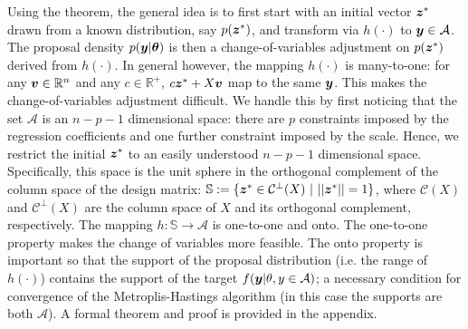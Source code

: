 \documentclass[ba]{imsart}
\def\bth{\mbox{\boldmath $\theta$}}
\newcommand{\by}{\mbox{\boldmath $y$}}
\newcommand{\bz}{\mbox{\boldmath $z$}}
\newcommand{\bv}{\mbox{\boldmath $v$}}
\newcommand{\bb}{\mbox{\boldmath $b$}}
\begin{document}
\noindent Using the theorem, the general idea is to first start with an initial vector $\bz^*$ drawn from a known distribution, say $p(\bz^*)$, and transform via $h(\cdot)$ to $\by \in \mathcal{A}$. The proposal density $p(\by|\bth)$ is then a change-of-variables adjustment on $p(\bz^*)$ derived from $h(\cdot)$.
In general however, the mapping $h(\cdot)$ is many-to-one: for any $\bv\in \mathbb{R}^{n}$ and any $c\in \mathbb{R}^{+}$, $c\bz^{*} + X\bv$ map to the same $\by$. This makes the change-of-variables adjustment difficult.
We handle this by first noticing that the set $\mathcal{A}$ is an $n - p - 1$ dimensional space:  there are $p$ constraints imposed by the regression coefficients and one further constraint imposed by the scale. Hence, we restrict the initial $\bz^*$ to an easily understood $n - p - 1$ dimensional space.  Specifically, this space is  the unit sphere in the orthogonal complement of the column space of the design matrix: $\mathbb{S} := \{\bz^* \in \mathcal{C}^{\perp}(X)\  |\  ||\bz^*|| = 1\}$, where $\mathcal{C}(X)$ and  $\mathcal{C}^{\perp}(X)$ are the column space of $X$ and its orthogonal complement, respectively. The mapping $h: \mathbb{S} \rightarrow \mathcal{A}$ is one-to-one and onto. The one-to-one property makes the change of variables more feasible. The onto property is important so that the support of the proposal distribution (i.e. the range of $h(\cdot)$) contains the support of the target  $f(\by | \theta, y\in \mathcal{A})$; a necessary condition for convergence of the Metroplis-Hastings algorithm (in this case the supports are both $\mathcal{A}$). A formal theorem and proof is provided in the appendix. 

\end{document}
